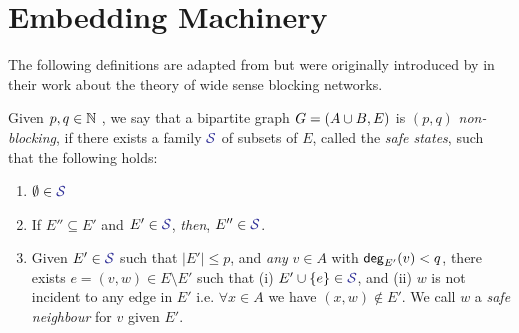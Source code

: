 \documentclass[11pt]{article}
\begin{document}
\section{Embedding Machinery}
\label{sec:embed-machinery}
The following definitions are adapted from \citep{nenadov2023routing} but were originally introduced by \citet{feldman1988wide} in their work about the theory of wide sense blocking networks.

\begin{definition}
Given $p,q \in \mathbb{N}$ , we say that a bipartite graph $G = (A \cup B, E)$ is $(p, q)$ \emph{non-blocking}, if there exists a family $\Family{S}$ of subsets of $E$, called the \emph{safe states}, such that the following holds:

\begin{enumerate}
	\item $\emptyset \in \Family{S}$
	\item If $E'' \subseteq E'$ and $E' \in \Family{S}$, \emph{then}, $E'' \in \Family{S}$.
	\item Given $E' \in \Family{S}$ such that $|E'| \leq p$, and \emph{any} $v \in A$ with $\mathsf{deg}_{E'}(v) < q$, there exists $e = (v, w) \in E \setminus E'$  such that (i) $E' \cup \Set{e} \in \SafeStates $, and (ii) $w$ is not incident to any edge in $E'$ i.e. $\forall x \in A$ we have $(x,w) \notin E'$. 
 We call $w$ a \emph{safe neighbour} for $v$ given $E'$.
\end{enumerate}

\end{definition}
\end{document}
